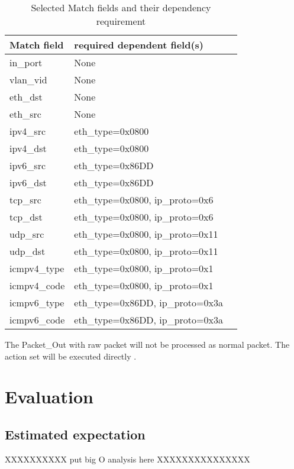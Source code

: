 \begin{table}[H]
\centering
\caption{Selected Match fields and their dependency requirement}
\begin{tabular}{|l|p{4cm}|p{8cm}}
\hline Match field & required dependent field(s) \\
\hline in\_port & None \\
\hline vlan\_vid & None \\
\hline eth\_dst & None \\
\hline eth\_src & None \\
\hline ipv4\_src & eth\_type=0x0800 \\
\hline ipv4\_dst & eth\_type=0x0800 \\
\hline ipv6\_src & eth\_type=0x86DD \\ 
\hline ipv6\_dst & eth\_type=0x86DD \\
\hline tcp\_src & eth\_type=0x0800, ip\_proto=0x6 \\
\hline tcp\_dst & eth\_type=0x0800, ip\_proto=0x6 \\
\hline udp\_src & eth\_type=0x0800, ip\_proto=0x11 \\
\hline udp\_dst & eth\_type=0x0800, ip\_proto=0x11 \\
\hline icmpv4\_type & eth\_type=0x0800, ip\_proto=0x1 \\
\hline icmpv4\_code & eth\_type=0x0800, ip\_proto=0x1 \\
\hline icmpv6\_type & eth\_type=0x86DD, ip\_proto=0x3a \\
\hline icmpv6\_code & eth\_type=0x86DD, ip\_proto=0x3a \\
\hline 
\end{tabular}
\label{table:selected_match_fields}
\end{table}

The Packet\_Out with raw packet will not be processed as normal packet. The action set will be executed directly \cite{PACKETOUT}.

\section{Evaluation}

\subsection{Estimated expectation}
XXXXXXXXXX put big O analysis here XXXXXXXXXXXXXXX
